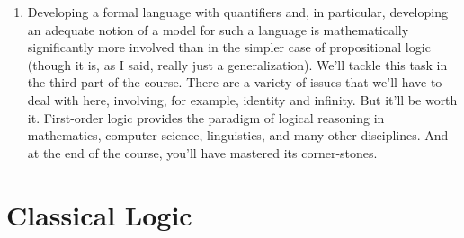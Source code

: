 \begin{enumerate}[\thesection.1]
	\item Developing a formal language with quantifiers and, in particular, developing an adequate notion of a model for such a language is mathematically significantly more involved than in the simpler case of propositional logic (though it is, as I said, really just a generalization). We'll tackle this task in the third part of the course. There are a variety of issues that we'll have to deal with here, involving, for example, identity and infinity. But it'll be worth it. First-order logic provides the paradigm of logical reasoning in mathematics, computer science, linguistics, and many other disciplines. And at the end of the course, you'll have mastered its corner-stones.

\end{enumerate}

\section{Classical Logic}

